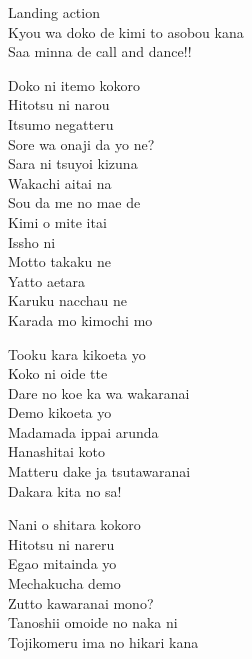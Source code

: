 \def\songtitle{Landing action Yeah!!}
\def\songcomment{Next Step! Project Theme Song}
\def\songlyrics{Aki Hata}
\def\songwriter{Hajime Mitsumasu}
\def\songarrange{TAKAROT}
   
\ifdefined\COMPLETE
\else
	
	
\fi
\thispagestyle{song}

{\small{}}
\begin{multicols}{2}
Landing action\\
Kyou wa doko de kimi to asobou kana\\
Saa minna de call and dance!!\\


Doko ni itemo kokoro\\
Hitotsu ni narou\\
Itsumo negatteru\\
Sore wa onaji da yo ne?\\
Sara ni tsuyoi kizuna\\
Wakachi aitai na\\
Sou da me no mae de\\
Kimi o mite itai\\

Issho ni \\
Motto takaku ne \\
Yatto aetara\\
Karuku nacchau ne\\
Karada mo kimochi mo \\


Tooku kara kikoeta yo\\
Koko ni oide tte\\
Dare no koe ka wa wakaranai\\
Demo kikoeta yo\\
Madamada ippai arunda\\
Hanashitai koto\\
Matteru dake ja tsutawaranai\\
Dakara kita no sa!\\


Nani o shitara kokoro\\
Hitotsu ni nareru\\
Egao mitainda yo\\
Mechakucha demo \\
Zutto kawaranai mono?\\
Tanoshii omoide no naka ni\\
Tojikomeru ima no hikari kana\columnbreak


\end{multicols}
